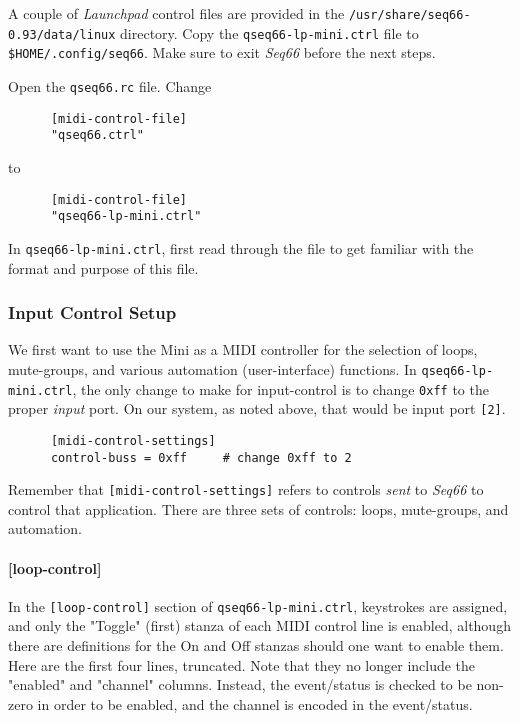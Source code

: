    A couple of \textsl{Launchpad} control files are provided in the
   \texttt{/usr/share/seq66-0.93/data/linux} directory.
   Copy the \texttt{qseq66-lp-mini.ctrl} file to
   \texttt{\$HOME/.config/seq66}.
   Make sure to exit \textsl{Seq66} before the next steps.

   Open the \texttt{qseq66.rc} file.  Change

   \begin{verbatim}
      [midi-control-file]
      "qseq66.ctrl"
   \end{verbatim}

   to

   \begin{verbatim}
      [midi-control-file]
      "qseq66-lp-mini.ctrl"
   \end{verbatim}

   In \texttt{qseq66-lp-mini.ctrl}, first read through the file to get familiar
   with the format and purpose of this file.

\subsubsection{Input Control Setup}
\label{subsubsec:launchpad_mini_input_control_setup}

   We first want to use the Mini as a MIDI controller for
   the selection of loops, mute-groups, and various automation (user-interface)
   functions.
   In \texttt{qseq66-lp-mini.ctrl},
   the only change to make for input-control is
   to change \texttt{0xff} to the proper \textsl{input} port.  On our system,
   as noted above, that would be input port \texttt{[2]}.

   \begin{verbatim}
      [midi-control-settings]
      control-buss = 0xff     # change 0xff to 2
   \end{verbatim}

   Remember that \texttt{[midi-control-settings]} refers to controls
   \textsl{sent} to \textsl{Seq66} to control that application.
   There are three sets of controls:  loops, mute-groups, and automation.

\paragraph{[loop-control]}
\label{paragraph:patterns_loop_control}

   In the \texttt{[loop-control]} section of \texttt{qseq66-lp-mini.ctrl},
   keystrokes are assigned, and only the "Toggle" (first)
   stanza of each MIDI control line
   is enabled, although there are definitions for the On and Off stanzas
   should one want to enable them.  Here are the first four lines, truncated.
   Note that they no longer include the "enabled" and "channel" columns.
   Instead, the event/status is checked to be non-zero in order to be enabled,
   and the channel is encoded in the event/status.

